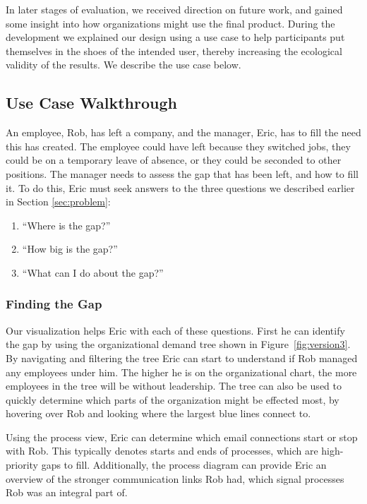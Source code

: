 \documentclass[journal]{vgtc}                %
\begin{document}
In later stages of evaluation, we received direction on future work, and gained some insight into how organizations might use the final product.  During the development we explained our design using a use case to help participants put themselves in the shoes of the intended user, thereby increasing the ecological validity of the results. We describe the use case below. 

\subsection{Use Case Walkthrough}
An employee, Rob, has left a company, and the manager, Eric, has to fill the need this has created. The employee could have left because they switched jobs, they could be on a temporary leave of absence, or they could be seconded to other positions. The manager needs to assess the gap that has been left, and how to fill it. To do this, Eric must seek answers to the three questions we described earlier in Section \ref{sec:problem}:

\begin{enumerate}
\item ``Where is the gap?''
\item ``How big is the gap?''
\item ``What can I do about the gap?''
\end{enumerate}

\subsubsection{Finding the Gap}
Our visualization helps Eric with each of these questions.  First he can identify the gap by using the organizational demand tree shown in Figure~\ref{fig:version3}.  By navigating and filtering the tree Eric can start to understand if Rob managed any employees under him. The higher he is on the organizational chart, the more employees in the tree will be without leadership. The tree can also be used to quickly determine which parts of the organization might be effected most, by hovering over Rob and looking where the largest blue lines connect to.

Using the process view, Eric can determine which email connections start or stop with Rob.  This typically denotes starts and ends of processes, which are high-priority gaps to fill.  Additionally, the process diagram can provide Eric an overview of the stronger communication links Rob had, which signal processes Rob was an integral part of.
\end{document}
